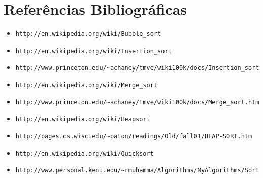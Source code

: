 \documentclass[10pt,a4paper]{report}
\begin{document}
\chapter{Referências Bibliográficas}

\begin{itemize}
\item \begin{verbatim}http://en.wikipedia.org/wiki/Bubble_sort\end{verbatim}
\item \begin{verbatim}http://en.wikipedia.org/wiki/Insertion_sort\end{verbatim}
\item \begin{verbatim}http://www.princeton.edu/~achaney/tmve/wiki100k/docs/Insertion_sort.html\end{verbatim}
\item \begin{verbatim}http://en.wikipedia.org/wiki/Merge_sort\end{verbatim}
\item \begin{verbatim}http://www.princeton.edu/~achaney/tmve/wiki100k/docs/Merge_sort.html\end{verbatim}
\item \begin{verbatim}http://en.wikipedia.org/wiki/Heapsort\end{verbatim}
\item \begin{verbatim}http://pages.cs.wisc.edu/~paton/readings/Old/fall01/HEAP-SORT.htm\end{verbatim}
\item \begin{verbatim}http://en.wikipedia.org/wiki/Quicksort\end{verbatim}
\item \begin{verbatim}http://www.personal.kent.edu/~rmuhamma/Algorithms/MyAlgorithms/Sorting/quickSort.htm\end{verbatim}
\end{itemize}
\end{document}

